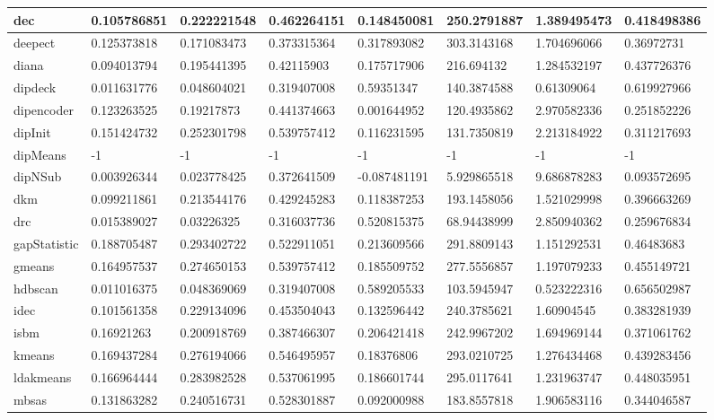 \begin{table}[H]
\begin{tabular}{|l|l|l|l|l|l|l|l|}
\hline
dec & 0.105786851 & 0.222221548 & 0.462264151 & 0.148450081 & 250.2791887 & 1.389495473 & 0.418498386 \\
\hline
deepect & 0.125373818 & 0.171083473 & 0.373315364 & 0.317893082 & 303.3143168 & 1.704696066 & 0.36972731 \\
\hline
diana & 0.094013794 & 0.195441395 & 0.42115903 & 0.175717906 & 216.694132 & 1.284532197 & 0.437726376 \\
\hline
dipdeck & 0.011631776 & 0.048604021 & 0.319407008 & 0.59351347 & 140.3874588 & 0.61309064 & 0.619927966 \\
\hline
dipencoder & 0.123263525 & 0.19217873 & 0.441374663 & 0.001644952 & 120.4935862 & 2.970582336 & 0.251852226 \\
\hline
dipInit & 0.151424732 & 0.252301798 & 0.539757412 & 0.116231595 & 131.7350819 & 2.213184922 & 0.311217693 \\
\hline
dipMeans & -1 & -1 & -1 & -1 & -1 & -1 & -1 \\
\hline
dipNSub & 0.003926344 & 0.023778425 & 0.372641509 & -0.087481191 & 5.929865518 & 9.686878283 & 0.093572695 \\
\hline
dkm & 0.099211861 & 0.213544176 & 0.429245283 & 0.118387253 & 193.1458056 & 1.521029998 & 0.396663269 \\
\hline
drc & 0.015389027 & 0.03226325 & 0.316037736 & 0.520815375 & 68.94438999 & 2.850940362 & 0.259676834 \\
\hline
gapStatistic & 0.188705487 & 0.293402722 & 0.522911051 & 0.213609566 & 291.8809143 & 1.151292531 & 0.46483683 \\
\hline
gmeans & 0.164957537 & 0.274650153 & 0.539757412 & 0.185509752 & 277.5556857 & 1.197079233 & 0.455149721 \\
\hline
hdbscan & 0.011016375 & 0.048369069 & 0.319407008 & 0.589205533 & 103.5945947 & 0.523222316 & 0.656502987 \\
\hline
idec & 0.101561358 & 0.229134096 & 0.453504043 & 0.132596442 & 240.3785621 & 1.60904545 & 0.383281939 \\
\hline
isbm & 0.16921263 & 0.200918769 & 0.387466307 & 0.206421418 & 242.9967202 & 1.694969144 & 0.371061762 \\
\hline
kmeans & 0.169437284 & 0.276194066 & 0.546495957 & 0.18376806 & 293.0210725 & 1.276434468 & 0.439283456 \\
\hline
ldakmeans & 0.166964444 & 0.283982528 & 0.537061995 & 0.186601744 & 295.0117641 & 1.231963747 & 0.448035951 \\
\hline
mbsas & 0.131863282 & 0.240516731 & 0.528301887 & 0.092000988 & 183.8557818 & 1.906583116 & 0.344046587 \\

\end{tabular}
\end{table}
